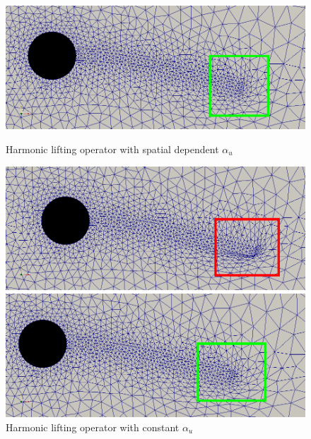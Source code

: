 \begin{figure}[H]  
  \begin{minipage}[b]{0.6\linewidth}
    \centering
    \includegraphics[scale=0.25]{./Mesh_motion_results/CSM1_laplace_rectangle.png} 
    \caption{Harmonic lifting operator with spatial dependent $\alpha_u$} 
    \vspace{4ex}
  \end{minipage}%
  \begin{minipage}[b]{0.6\linewidth}
    \centering
    \includegraphics[scale=0.25]{./Mesh_motion_results/CSM1_constant_rectangle.png} 
    \caption{Harmonic lifting operator with constant $\alpha_u$} 
    \vspace{4ex}
  \end{minipage} 
  \begin{minipage}[b]{0.6\linewidth}
    \centering
    \includegraphics[scale=0.25]{./Mesh_motion_results/CSM1_bibc1_rectangle.png} 

\end{minipage}
\end{figure}
